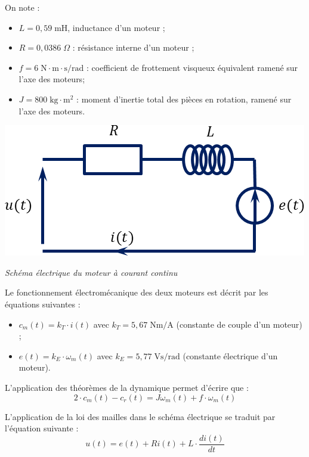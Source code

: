 \documentclass[10pt]{article}
\begin{document}
On note : 
\begin{minipage}[c]{.49\linewidth}
\begin{itemize}
\item $L=0,59 \; \text{mH}$, inductance d’un moteur ;
\item $R=0,0386 \; \Omega$ : résistance interne d'un moteur ;
\item $f=6 \; \text{N}\cdot \text{m}\cdot \text{s/rad}$ : coefficient de frottement visqueux équivalent ramené sur l’axe des moteurs;
\item $J=800 \; \text{kg}\cdot \text{m}^2$ : moment d’inertie total des pièces en rotation, ramené sur l’axe des moteurs.
\end{itemize}
\end{minipage}\hfill
\begin{minipage}[c]{.49\linewidth}
\begin{center}
\includegraphics[width=.8\textwidth]{images/SchemaElectrique}

\textit{Schéma électrique du moteur à courant continu}

\end{center}
\end{minipage}

\vspace{.25cm}
Le fonctionnement électromécanique des deux moteurs est décrit par les équations suivantes :
\begin{itemize}
\item $c_m (t)=k_T \cdot i(t)$ avec $k_T=5,67 \;\text{Nm/A}$ (constante de couple d’un moteur) ;
\item $e(t)=k_E \cdot \omega_m (t)$ avec $k_E=5,77 \; \text{Vs/rad}$ (constante électrique d’un moteur).
\end{itemize}

L’application des théorèmes de la dynamique permet d’écrire que : 
$$ 2\cdot c_m (t)-c_r (t)=J\omega_m (t)+f\cdot \omega_m (t)$$

L’application de la loi des mailles dans le schéma électrique se traduit par l’équation suivante :
$$u(t)=e(t)+Ri(t)+L \cdot \dfrac{di(t)}{dt}$$
\end{document}
